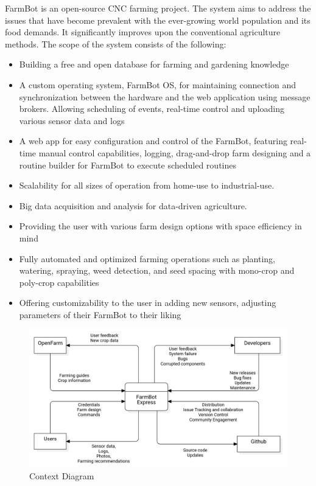 FarmBot is an open-source CNC farming project. The system aims to address the issues that have become prevalent with the ever-growing world population and its food demands. It significantly improves upon the conventional agriculture methods.
The scope of the system consists of the following:
\begin{itemize}
    \item Building a free and open database for farming and gardening knowledge
    \item A custom operating system, FarmBot OS, for maintaining connection and synchronization between the hardware and the web application using message brokers. Allowing scheduling of events, real-time control and uploading various sensor data and logs
    \item A web app for easy configuration and control of the FarmBot, featuring real-time manual control capabilities, logging, drag-and-drop farm designing and a routine builder for FarmBot to execute scheduled routines
    \item Scalability for all sizes of operation from home-use to industrial-use.
    \item Big data acquisition and analysis for data-driven agriculture.
    \item Providing the user with various farm design options with space efficiency in mind
    \item Fully automated and optimized farming operations such as planting, watering, spraying, weed detection, and seed spacing with mono-crop and poly-crop capabilities
    \item Offering customizability to the user in adding new sensors, adjusting parameters of their FarmBot to their liking
\end{itemize}

\begin{figure}[H]
    \centering
    \includegraphics[width=1\textwidth]{UML Diagrams/ContextDiagram.png}
    \caption{Context Diagram}
    \label{fig:context-diagram}
\end{figure}
